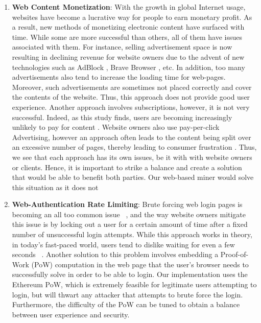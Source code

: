 \documentclass[10pt, conference, compsocconf]{IEEEtran}
\begin{document}
\begin{enumerate}

\item \textbf{Web Content Monetization}: With the growth in global Internet usage, websites have become a lucrative way for people to earn monetary profit. As a result, new methods of monetizing electronic content have surfaced with time. While some are more successful than others, all of them have issues associated with them. For instance, selling advertisement space is now resulting in declining revenue \cite{decliningRevenue} for website owners due to the advent of new technologies such as AdBlock \cite{Adblock}, Brave Browser \cite{BraveBrowser}, etc. In addition, too many advertisements also tend to increase the loading time for web-pages. Moreover, such advertisements are sometimes not placed correctly and cover the contents of the website. Thus, this approach does not provide good user experience. Another approach involves subscriptions, however, it is not very successful. Indeed, as this study finds, users are becoming increasingly unlikely to pay for content \cite{noSubscriptions}. Website owners also use pay-per-click Advertising, however an approach often leads to the content being split over an excessive number of pages, thereby leading to consumer frustration \cite{payPerClick}. Thus, we see that each approach has its own issues, be it with  with website owners or clients. Hence, it is important to strike a balance and create a solution that would be able to benefit both parties. Our web-based miner would solve this situation as it does not 
\item \textbf{Web-Authentication Rate Limiting}: Brute forcing web login pages is becoming an all too common issue ~\cite{webLoginBruteForce}, and the way website owners mitigate this issue is by locking out a user for a certain amount of time after a fixed number of unsuccessful login attempts. While this approach works in theory, in today's fast-paced world, users tend to dislike waiting for even a few seconds ~\cite{usersDislikeWaiting}. Another solution to this problem involves embedding a Proof-of-Work (PoW) computation in the web page that the user's browser needs to successfully solve in order to be able to login. Our implementation uses the Ethereum PoW, which is extremely feasible for legitimate users attempting to login, but will thwart any attacker that attempts to brute force the login. Furthermore, the difficulty of the PoW can be tuned to obtain a balance between user experience and security. 

\end{enumerate}
\end{document}

